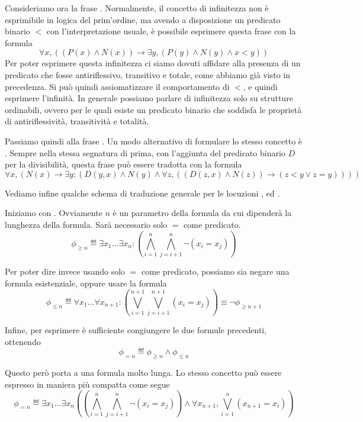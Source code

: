 Consideriamo ora la frase . Normalmente, il concetto di infinitezza non è esprimibile in logica del prim'ordine, ma avendo a disposizione un predicato binario \(<\) con l'interpretazione usuale, è possibile esprimere questa frase con la formula
\[\forall x,( (P(x) \land N(x)) \to \exists y, (P(y) \land N(y) \land x<y))\]
Per poter esprimere questa infinitezza ci siamo dovuti affidare alla presenza di un predicato che fosse antiriflessivo, transitivo e totale, come abbiamo già visto in precedenza. Si può quindi assiomatizzare il comportamento di \(<\), e quindi esprimere l'infinità. In generale possiamo parlare di infinitezza solo su strutture ordinabili, ovvero per le quali esiste un predicato binario che soddisfa le proprietà di antiriflessività, transitività e totalità. 

Passiamo quindi alla frase . Un modo alternativo di formulare lo stesso concetto è . Sempre nella stessa segnatura di prima, con l'aggiunta del predicato binario \(D\) per la divisibilità, questa frase può essere tradotta con la formula
\[\forall x, (N(x) \to \exists y: (D(y,x) \land N(y) \land \forall z, ((D(z,x) \land N(z)) \to (z < y \lor z = y))))\]

Vediamo infine qualche schema di traduzione generale per le locuzioni ,  ed .

Iniziamo con . Ovviamente \(n\) è un parametro della formula da cui dipenderà la lunghezza della formula. Sarà necessario solo \(=\) come predicato.
\[\phi_{\geq n} \eqdef \exists x_1 \dots \exists x_n: (\bigwedge_{i=1}^n \bigwedge_{j=i+1}^n \neg (x_i = x_j))\]

Per poter dire invece  usando solo \(=\) come predicato, possiamo sia negare una formula esistenziale, oppure usare la formula
\[\phi_{\leq n} \eqdef \forall x_1 \dots \forall x_{n+1}: (\bigvee_{i=1}^{n+1} \bigvee_{j=i+1}^{n+1} (x_i = x_j))\equiv \neg \phi_{\geq n+1}\]

Infine, per esprimere  è sufficiente congiungere le due formule precedenti, ottenendo
\[\phi_{= n} \eqdef \phi_{\geq n} \land \phi_{\leq n}\]

Questo però porta a una formula molto lunga. Lo stesso concetto può essere espresso in maniera più compatta come segue
\[\phi_{= n} \eqdef \exists x_1 \dots \exists x_n ((\bigwedge_{i=1}^n \bigwedge_{j=i+1}^n \neg (x_i = x_j)) \land \forall x_{n+1}, \bigvee_{i=1}^{n} (x_{n+1} = x_i) )\]